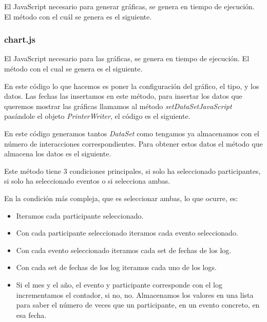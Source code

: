 El JavaScript necesario para generar gráficas, se genera en tiempo de ejecución. El método con el cuál se genera es el siguiente.


\subsubsection{chart.js}\label{chart-js}

El JavaScript necesario para las gráficas, se genera en tiempo de ejecución. El método con el cual se genera es el siguiente.


En este código lo que hacemos es poner la configuración del gráfico, el tipo, y los datos. Las fechas las insertamos en este método, para insertar los datos que queremos mostrar las gráficas llamamos al método \emph{setDataSetJavaScript} pasándole el objeto \emph{PrinterWriter}, el código es el siguiente.


En este código generamos tantos \emph{DataSet} como tengamos ya almacenamos con el número de interacciones correspondientes. Para obtener estos datos el método que almacena los datos es el siguiente.


Este método tiene 3 condiciones principales, si solo ha seleccionado participantes, si solo ha seleccionado eventos o si selecciona ambas.

En la condición más compleja, que es seleccionar ambas, lo que ocurre, es:

\begin{itemize}
	\tightlist
	\item
	Iteramos cada participante seleccionado.
	\item
	Con cada participante seleccionado iteramos cada evento seleccionado.
	\item
	Con cada evento seleccionado iteramos cada set de fechas de los log.
	\item
	Con cada set de fechas de los log iteramos cada uno de los logs.
	\item
	Si el mes y el año, el evento y participante corresponde con el log incrementamos el contador, si no, no. Almacenamos los valores en una lista para saber el número de veces que un participante, en un evento concreto, en esa fecha.
\end{itemize}

